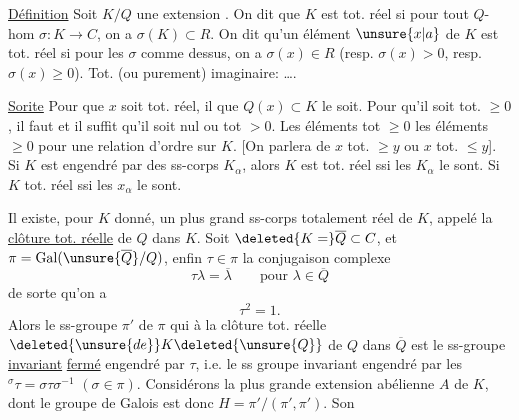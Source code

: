\uline{Définition} Soit $K/Q$ une extension  . On dit que $K$ est tot. réel si pour tout $Q$-hom $\sigma:K\to C$, on a $\sigma(K)\subset R$. On dit qu'un élément $\unsure{x|a}$ de $K$ est tot. réel  si pour les $\sigma$ comme dessus, on a $\sigma(x)\in R$ (resp. $\sigma(x)>0$, resp. $\sigma(x)\ge0$). Tot. (ou purement) imaginaire: \ldots.

\uline{Sorite} Pour que $x$ soit tot. réel, il  que $Q(x)\subset K$ le soit. Pour qu'il soit tot. $\ge0$, il faut et il suffit qu'il soit nul ou tot $>0$. Les éléments tot $\ge0$   les éléments $\ge0$ pour une relation d'ordre sur $K$. [On parlera de $x$ tot. $\ge y$ ou $x$ tot. $\le y$]. Si $K$ est engendré par des ss-corps $K_\alpha$, alors $K$ est tot. réel ssi les $K_\alpha$ le sont. Si  $K$ tot. réel ssi  les $x_\alpha$ le sont.

Il existe, pour $K$ donné, un plus grand ss-corps totalement réel de $K$, appelé la \uline{clôture tot. réelle} de $Q$ dans $K$. Soit $\deleted{K=}\overline Q\subset C$, et $\pi=\operatorname{Gal}(\unsure{\overline Q}/Q)$, enfin $\tau\in\pi$ la conjugaison complexe
\[
\tau\lambda=\overline\lambda\qquad\text{pour }\lambda\in\overline Q
\]
de sorte qu'on a
\[
\tau^2=1.
\]
Alors le ss-groupe $\pi'$ de $\pi$ qui   à la clôture tot. réelle $\deleted{\unsure{de}}K\deleted{\unsure{Q}}$ de $Q$ dans $\overline Q$ est  le ss-groupe \uline{invariant} \uline{fermé} engendré par $\tau$, i.e. le ss groupe invariant engendré par les ${}^{\sigma}\tau=\sigma\tau\sigma^{-1}$ $(\sigma\in\pi)$.
Considérons la plus grande extension abélienne $A$ de $K$, dont le groupe de Galois est donc $H=\pi'/(\pi',\pi')$.  Son
